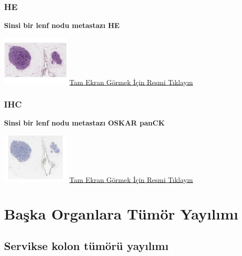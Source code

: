 \documentclass[
  letterpaper,
  DIV=11,
  numbers=noendperiod]{scrreprt}
\begin{document}
\hypertarget{he-7}{%
\subsection{HE}\label{he-7}}

\textbf{Sinsi bir lenf nodu metastazı HE}

\href{https://images.patolojiatlasi.com/insidious-lymph-node-metastasis/HE.html}{\includegraphics[width=0.25\textwidth,height=\textheight]{./screenshots/thumbnail_insidious-lymph-node-metastasis.png}}
\href{https://images.patolojiatlasi.com/insidious-lymph-node-metastasis/HE.html}{Tam
Ekran Görmek İçin Resmi Tıklayın}

\hypertarget{ihc-1}{%
\subsection{IHC}\label{ihc-1}}

\textbf{Sinsi bir lenf nodu metastazı OSKAR panCK}

\href{https://images.patolojiatlasi.com/insidious-lymph-node-metastasis/HE.html}{\includegraphics[width=0.25\textwidth,height=\textheight]{./screenshots/thumbnail_insidious-lymph-node-metastasis-OSKARCK.png}}
\href{https://images.patolojiatlasi.com/insidious-lymph-node-metastasis/OSKARCK.html}{Tam
Ekran Görmek İçin Resmi Tıklayın}

\hypertarget{sec-baska-organlara-tumor-yayilimi}{%
\chapter{Başka Organlara Tümör
Yayılımı}\label{sec-baska-organlara-tumor-yayilimi}}

\hypertarget{sec-servikse-kolon-tumor-yayilimi}{%
\section{Servikse kolon tümörü
yayılımı}\label{sec-servikse-kolon-tumor-yayilimi}}
\end{document}
